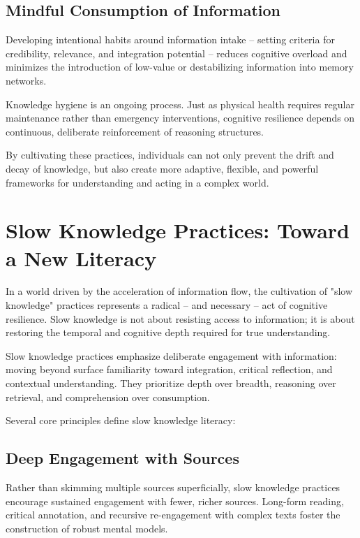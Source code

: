 \subsection{Mindful Consumption of Information}

Developing intentional habits around information intake -- setting
criteria for credibility, relevance, and integration potential -- reduces
cognitive overload and minimizes the introduction of low-value or
destabilizing information into memory networks.

Knowledge hygiene is an ongoing process. Just as physical health
requires regular maintenance rather than emergency interventions,
cognitive resilience depends on continuous, deliberate reinforcement of
reasoning structures.

By cultivating these practices, individuals can not only prevent the
drift and decay of knowledge, but also create more adaptive, flexible,
and powerful frameworks for understanding and acting in a complex world.


\section{Slow Knowledge Practices: Toward a New Literacy}

In a world driven by the acceleration of information flow, the
cultivation of "slow knowledge" practices represents a radical -- and
necessary -- act of cognitive resilience. Slow knowledge is not about
resisting access to information; it is about restoring the temporal and
cognitive depth required for true understanding.

Slow knowledge practices emphasize deliberate engagement with
information: moving beyond surface familiarity toward integration,
critical reflection, and contextual understanding. They prioritize depth
over breadth, reasoning over retrieval, and comprehension over
consumption.

Several core principles define slow knowledge literacy:

\subsection{Deep Engagement with Sources}

Rather than skimming multiple sources superficially, slow knowledge
practices encourage sustained engagement with fewer, richer sources.
Long-form reading, critical annotation, and recursive re-engagement with
complex texts foster the construction of robust mental models.

